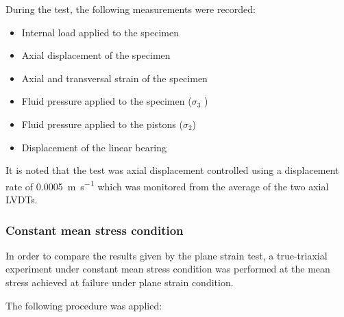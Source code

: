 During the test, the following measurements were recorded: 

\begin{itemize}
    \item Internal load applied to the specimen 
    \item Axial displacement of the specimen 
    \item Axial and transversal strain of the specimen
    \item Fluid pressure applied to the specimen ($\sigma_3$ ) 
    \item Fluid pressure applied to the pistons ($\sigma_2$) 
    \item Displacement of the linear bearing
\end{itemize}

It is noted that the test was axial displacement controlled using a displacement rate of \SI{0.0005}{\meter\per\second} which was monitored from the average of the two axial LVDTs.

\subsubsection{Constant mean stress condition}


In order to compare the results given by the plane strain test, a true-triaxial experiment under constant mean stress condition was performed at the mean stress achieved at failure under plane strain condition. 

The following procedure was applied:  

